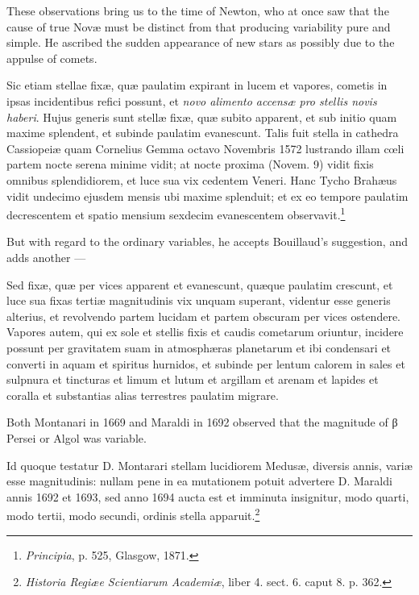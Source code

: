 \documentclass[a4paper, 12pt, oneside, polutonikogreek, english]{article}
\begin{document}
These observations bring us to the time of Newton, who at once saw that the cause of true Novæ must be distinct from that producing variability pure and simple. He ascribed the sudden appearance of new stars as possibly due to the appulse of comets.

Sic etiam stellae fixæ, quæ paulatim expirant in lucem et vapores, cometis in ipsas incidentibus refici possunt, et \emph{novo alimento accensæ pro stellis novis haberi}. Hujus generis sunt stellæ fixæ, quæ subito apparent, et sub initio quam maxime splendent, et subinde paulatim evanescunt. Talis fuit stella in cathedra Cassiopeiæ quam Cornelius Gemma octavo Novembris 1572 lustrando illam cœli partem nocte serena minime vidit; at nocte proxima (Novem. 9) vidit fixis omnibus splendidiorem, et luce sua vix cedentem Veneri. Hanc Tycho Brahæus vidit undecimo ejusdem mensis ubi maxime splenduit; et ex eo tempore paulatim decrescentem et spatio mensium sexdecim evanescentem observavit.\footnote{\emph{Principia}, p. 525, Glasgow, 1871.}

But with regard to the ordinary variables, he accepts Bouillaud's suggestion, and adds another ---

Sed fixæ, quæ per vices apparent et evanescunt, quæque paulatim crescunt, et luce sua fixas tertiæ magnitudinis vix unquam superant, videntur esse generis alterius, et revolvendo partem lucidam et partem obscuram per vices ostendere. Vapores autem, qui ex sole et stellis fixis et caudis cometarum oriuntur, incidere possunt per gravitatem suam in atmosphæras planetarum et ibi condensari et converti in aquam et spiritus hurnidos, et subinde per lentum calorem in sales et sulpnura et tincturas et limum et lutum et argillam et arenam et lapides et coralla et substantias alias terrestres paulatim migrare.

Both Montanari in 1669 and Maraldi in 1692 observed that the magnitude of β Persei or Algol was variable.

Id quoque testatur D. Montarari stellam lucidiorem Medusæ, diversis annis, variæ esse magnitudinis: nullam pene in ea mutationem potuit advertere D. Maraldi annis 1692 et 1693, sed anno 1694 aucta est et imminuta insignitur, modo quarti, modo tertii, modo secundi, ordinis stella apparuit.\footnote{\emph{Historia Regiæe Scientiarum Academiæ}, liber 4. sect. 6. caput 8. p. 362.}
\end{document}

